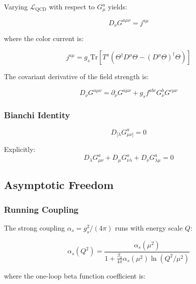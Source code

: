 Varying $\mathcal{L}_{\text{QCD}}$ with respect to $G^a_\mu$ yields:

\begin{equation}
\label{eq:canonical:yang_mills}
D_\nu G^{a\mu\nu} = j^{a\mu}
\end{equation}

where the color current is:

\begin{equation}
\label{eq:canonical:color_current}
j^{a\mu} = g_s \text{Tr}\left[T^a \left(\Theta^\dagger D^\mu\Theta - (D^\mu\Theta)^\dagger \Theta\right)\right]
\end{equation}

The covariant derivative of the field strength is:

\begin{equation}
D_\nu G^{a\mu\nu} = \partial_\nu G^{a\mu\nu} + g_s f^{abc} G^b_\nu G^{c\mu\nu}
\end{equation}

\subsubsection{Bianchi Identity}

\begin{equation}
\label{eq:canonical:bianchi_qcd}
D_{[\lambda} G^a_{\mu\nu]} = 0
\end{equation}

Explicitly:
\begin{equation}
D_\lambda G^a_{\mu\nu} + D_\mu G^a_{\nu\lambda} + D_\nu G^a_{\lambda\mu} = 0
\end{equation}

\subsection{Asymptotic Freedom}

\subsubsection{Running Coupling}

The strong coupling $\alpha_s = g_s^2/(4\pi)$ runs with energy scale $Q$:

\begin{equation}
\label{eq:canonical:alpha_s_running}
\alpha_s(Q^2) = \frac{\alpha_s(\mu^2)}{1 + \frac{\beta_0}{4\pi}\alpha_s(\mu^2)\ln(Q^2/\mu^2)}
\end{equation}

where the one-loop beta function coefficient is:

